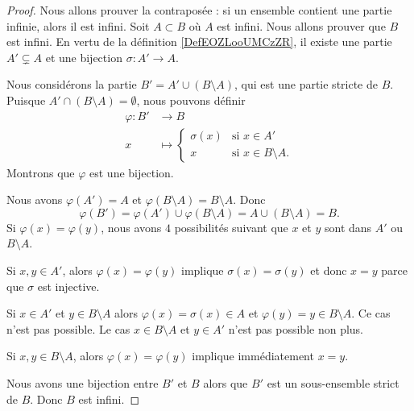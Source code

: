 \begin{proof}
	Nous allons prouver la contraposée : si un ensemble contient une partie infinie, alors il est infini. Soit \( A\subset B\) où \( A\) est infini. Nous allons prouver que \( B\) est infini. En vertu de la définition \ref{DefEOZLooUMCzZR}, il existe une partie \( A'\subsetneq A\) et une bijection \( \sigma\colon A'\to A\).

	Nous considérons la partie \( B'=A'\cup(B\setminus A)\), qui est une partie stricte de \( B\). Puisque \( A'\cap (B\setminus A)=\emptyset\), nous pouvons définir
	\begin{equation}
		\begin{aligned}
			\varphi\colon B' & \to B                                             \\
			x                & \mapsto \begin{cases}
				                           \sigma(x) & \text{si } x\in A'            \\
				                           x         & \text{si } x\in B\setminus A.
			                           \end{cases}
		\end{aligned}
	\end{equation}
	Montrons que \( \varphi\) est une bijection.
	\begin{subproof}
		\spitem[Surjectif]
		Nous avons \( \varphi(A')=A\) et \( \varphi(B\setminus A)=B\setminus A\). Donc
		\begin{equation}
			\varphi(B')=\varphi(A')\cup\varphi(B\setminus A)=A\cup (B\setminus A)=B.
		\end{equation}
		\spitem[Injectif]
		Si \( \varphi(x)=\varphi(y)\), nous avons \( 4\) possibilités suivant que \( x\) et \( y\) sont dans \( A'\) ou \( B\setminus A\).

		Si \( x,y\in A'\), alors \( \varphi(x)=\varphi(y)\) implique \( \sigma(x)=\sigma(y)\) et donc \( x=y\) parce que \( \sigma\) est injective.

		Si \( x\in A'\) et \( y\in B\setminus A\) alors \( \varphi(x)=\sigma(x)\in A\) et \( \varphi(y)=y\in B\setminus A\). Ce cas n'est pas possible. Le cas \( x\in B\setminus A\) et \( y\in A'\) n'est pas possible non plus.

		Si \( x,y\in B\setminus A\), alors \( \varphi(x)=\varphi(y)\) implique immédiatement \( x=y\).
	\end{subproof}
	Nous avons une bijection entre \( B'\) et \( B\) alors que \( B'\) est un sous-ensemble strict de \( B\). Donc \( B\) est infini.
\end{proof}

